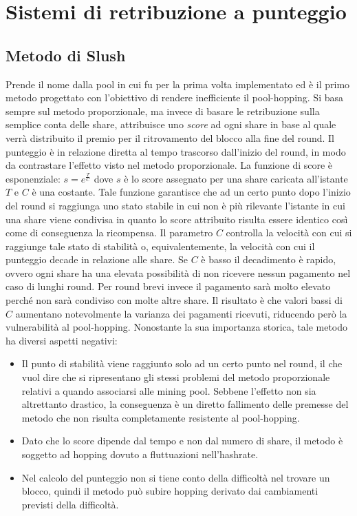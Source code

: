 \section{Sistemi di retribuzione a punteggio}

\subsection{Metodo di Slush}\label{pool-slush}

Prende il nome dalla pool in cui fu per la prima volta implementato ed è il primo metodo progettato con l'obiettivo di rendere inefficiente il pool-hopping.
Si basa sempre sul metodo proporzionale, ma invece di basare le retribuzione sulla semplice conta delle share, attribuisce uno \emph{score} ad ogni share in base al quale verrà distribuito il premio per il ritrovamento del blocco alla fine del round.
Il punteggio è in relazione diretta al tempo trascorso dall'inizio del round, in modo da contrastare l'effetto visto nel metodo proporzionale. La funzione di score è esponenziale: $s=e^{\frac{T}{C}}$ dove $s$ è lo score assegnato per una share caricata all'istante $T$ e $C$ è una costante.
Tale funzione garantisce che ad un certo punto dopo l'inizio del round si raggiunga uno stato stabile in cui non è più rilevante l'istante in cui una share viene condivisa in quanto lo score attribuito risulta essere identico così come di conseguenza la ricompensa.
Il parametro $C$ controlla la velocità con cui si raggiunge tale stato di stabilità o, equivalentemente, la velocità con cui il punteggio decade in relazione alle share. Se $C$ è basso il decadimento è rapido, ovvero ogni share ha una elevata possibilità di non ricevere nessun pagamento nel caso di lunghi round. Per round brevi invece il pagamento sarà molto elevato perché non sarà condiviso con molte altre share.
Il risultato è che valori bassi di $C$ aumentano notevolmente la varianza dei pagamenti ricevuti, riducendo però la vulnerabilità al pool-hopping.
Nonostante la sua importanza storica, tale metodo ha diversi aspetti negativi:

\begin{itemize}
	\item Il punto di stabilità viene raggiunto solo ad un certo punto nel round, il che vuol dire che si ripresentano gli stessi problemi del metodo proporzionale relativi a quando associarsi alle mining pool. Sebbene l'effetto non sia altrettanto drastico, la conseguenza è un diretto fallimento delle premesse del metodo che non risulta completamente resistente al pool-hopping.
	\item Dato che lo score dipende dal tempo e non dal numero di share, il metodo è soggetto ad hopping dovuto a fluttuazioni nell'hashrate.
	\item Nel calcolo del punteggio non si tiene conto della difficoltà nel trovare un blocco, quindi il metodo può subire hopping derivato dai cambiamenti previsti della difficoltà.
\end{itemize}


